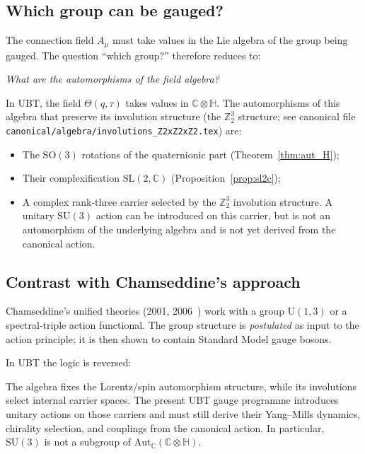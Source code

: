 \documentclass[12pt,a4paper]{article}
\theoremstyle{definition}
\theoremstyle{remark}
\begin{document}
\subsection{Which group can be gauged?}

The connection field $A_\mu$ must take values in the Lie algebra of the group
being gauged.  The question ``which group?'' therefore reduces to:

\begin{center}
  \textit{What are the automorphisms of the field algebra?}
\end{center}

In UBT, the field $\Theta(q,\tau)$ takes values in $\mathbb{C}\otimes\mathbb{H}$.
The automorphisms of this algebra that preserve its involution structure
(the $\mathbb{Z}_2^3$ structure; see canonical file
\texttt{canonical/algebra/\allowbreak involutions\_Z2xZ2xZ2.tex}) are:
\begin{itemize}
  \item The $\mathrm{SO}(3)$ rotations of the quaternionic part
    (Theorem~\ref{thm:aut_H});
  \item Their complexification $\mathrm{SL}(2,\mathbb{C})$
    (Proposition~\ref{prop:sl2c});
  \item A complex rank-three carrier selected by the $\mathbb{Z}_2^3$
    involution structure.  A unitary $\mathrm{SU}(3)$ action can be introduced
    on this carrier, but is not an automorphism of the underlying algebra and
    is not yet derived from the canonical action.
\end{itemize}

\subsection{Contrast with Chamseddine's approach}

Chamseddine's unified theories (2001, 2006~\cite{chamseddine2001,chamseddine2006})
work with a group $\mathrm{U}(1,3)$ or a spectral-triple action functional.
The group structure is \emph{postulated} as input to the action principle;
it is then shown to contain Standard Model gauge bosons.

In UBT the logic is reversed:

\begin{keybox}
\sloppy
  The algebra fixes the Lorentz/spin automorphism structure, while its
  involutions select internal carrier spaces.  The present UBT gauge programme
  introduces unitary actions on those carriers and must still derive their
  Yang--Mills dynamics, chirality selection, and couplings from the canonical
  action.  In particular, $\mathrm{SU}(3)$ is not a subgroup of
  $\mathrm{Aut}_{\mathbb{C}}(\mathbb{C}\otimes\mathbb{H})$.
\end{keybox}
\end{document}
